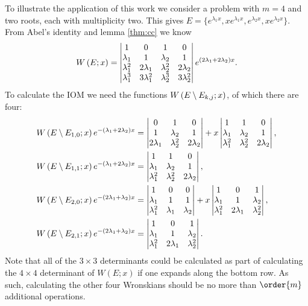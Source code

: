 \documentclass{article}
\begin{document}
To illustrate the application of this work we consider a problem with $m=4$ and two roots, each with multiplicity two.
This gives $E = \{e^{\lambda_1 x}, x e^{\lambda_1 x}, e^{\lambda_2 x}, x e^{\lambda_2 x} \}$.
From Abel's identity and lemma \ref{thm:cc} we know
\begin{equation*}
W \left ( E ; x \right ) = \begin{vmatrix} 1 & 0 & 1 & 0 \\ \lambda_1 & 1 & \lambda_2 & 1 \\
\lambda_1^2 & 2 \lambda_1 & \lambda_2^2 & 2 \lambda_2 \\
\lambda_1^3 & 3 \lambda_1^2 & \lambda_2^3 & 3 \lambda^2_2 \end{vmatrix} e^{ (2 \lambda_1 + 2 \lambda_2 ) x } .
\end{equation*}
To calculate the IOM we need the functions $W \left ( E \setminus E_{k,j} ; x \right )$, of which there are four:
\begin{align*}
W \left ( E \setminus E_{1,0} ; x \right ) e^{ -( \lambda_1 + 2 \lambda_2 ) x } & = \begin{vmatrix} 0 & 1 & 0 \\ 1 & \lambda_2 & 1 \\ 2 \lambda_1 & \lambda_2^2 & 2 \lambda_2 \end{vmatrix} + x \begin{vmatrix} 1 & 1 & 0 \\ \lambda_1 & \lambda_2 & 1 \\ \lambda_1^2 & \lambda_2^2 & 2 \lambda_2 \end{vmatrix}, \\
W \left ( E \setminus E_{1,1} ; x \right ) e^{ -( \lambda_1 + 2 \lambda_2 ) x } & = \begin{vmatrix} 1 & 1 & 0 \\ \lambda_1 & \lambda_2 & 1 \\ \lambda_1^2 & \lambda_2^2 & 2 \lambda_2 \end{vmatrix}, \\
W \left ( E \setminus E_{2,0} ; x \right ) e^{ -(2 \lambda_1 + \lambda_2 ) x } & = \begin{vmatrix} 1 & 0 & 0 \\ \lambda_1 & 1 & 1 \\ \lambda_1^2 & \lambda_1 & \lambda_2 \end{vmatrix} + x \begin{vmatrix} 1 & 0 & 1 \\ \lambda_1 & 1 & \lambda_2 \\ \lambda_1^2 & 2 \lambda_1 & \lambda_2^2 \end{vmatrix}, \\
W \left ( E \setminus E_{2,1} ; x \right ) e^{ -(2 \lambda_1 + \lambda_2 ) x } & = \begin{vmatrix} 1 & 0 & 1 \\ \lambda_1 & 1 & \lambda_2 \\ \lambda_1^2 & 2 \lambda_1 & \lambda_2^2 \end{vmatrix} .
\end{align*}
Note that all of the $3 \times 3$ determinants could be calculated as part of calculating the $4 \times 4$ determinant of $W(E;x)$ if one expands along the bottom row.
As such, calculating the other four Wronskians should be no more than $\order{m}$ additional operations.
\end{document}
